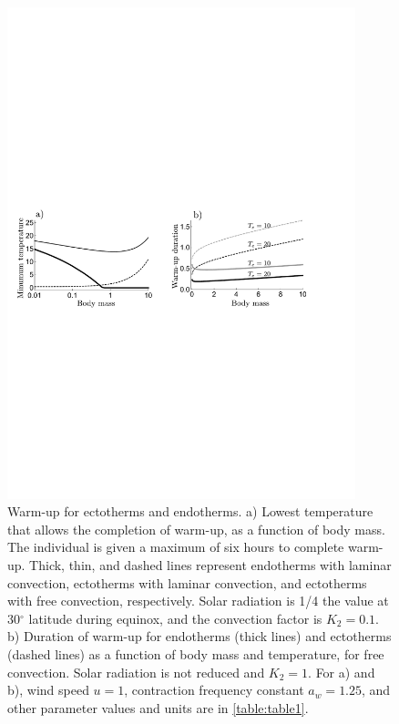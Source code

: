 \begin{figure}
\centering \includegraphics[width=0.9\textwidth]{fig3}
\caption{
    \setstretch{\stretchby}
	Warm-up for ectotherms and endotherms.
	a) Lowest temperature that allows the completion of warm-up, as a function of body mass.
	The individual is given a maximum of six hours to complete warm-up.
    Thick, thin, and dashed lines represent endotherms with laminar convection, ectotherms with laminar convection, and ectotherms with free convection, respectively.
    Solar radiation is 1/4 the value at 30$^\circ$ latitude during equinox, and the convection factor is $K_2 = 0.1$.
    b) Duration of warm-up for endotherms (thick lines) and ectotherms (dashed lines) as a function of body mass and temperature, for free convection.  %
    Solar radiation is not reduced and $K_2 = 1$.
    For a) and b), wind speed $u = 1$, contraction frequency constant $a_w = 1.25$, and other parameter values and units are in \cref{table:table1}.
}
\label{fig3}
\end{figure}
